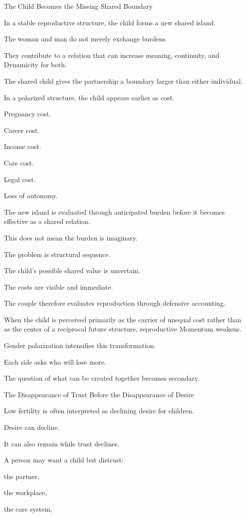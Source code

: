 The Child Becomes the Missing Shared Boundary

In a stable reproductive structure, the child forms a new shared island.

The woman and man do not merely exchange burdens.

They contribute to a relation that can increase meaning, continuity, and Dynamicity for both.

The shared child gives the partnership a boundary larger than either individual.

In a polarized structure, the child appears earlier as cost.

Pregnancy cost.

Career cost.

Income cost.

Care cost.

Legal cost.

Loss of autonomy.

The new island is evaluated through anticipated burden before it becomes effective as a shared relation.

This does not mean the burden is imaginary.

The problem is structural sequence.

The child’s possible shared value is uncertain.

The costs are visible and immediate.

The couple therefore evaluates reproduction through defensive accounting.

When the child is perceived primarily as the carrier of unequal cost rather than as the center of a reciprocal future structure, reproductive Momentum weakens.

Gender polarization intensifies this transformation.

Each side asks who will lose more.

The question of what can be created together becomes secondary.

The Disappearance of Trust Before the Disappearance of Desire

Low fertility is often interpreted as declining desire for children.

Desire can decline.

It can also remain while trust declines.

A person may want a child but distrust:

the partner,

the workplace,

the care system,

